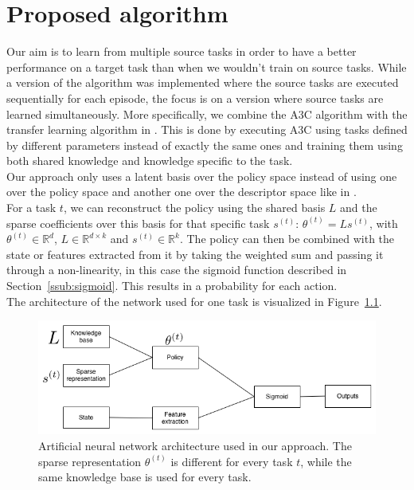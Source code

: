 \chapter{Proposed algorithm}
\label{cha:proposed_algorithm} %
Our aim is to learn from multiple source tasks in order to have a better performance on a target task than when we wouldn't train on source tasks.
While a version of the algorithm was implemented where the source tasks are executed sequentially for each episode, the focus is on a version where source tasks are learned simultaneously.
More specifically, we combine the A3C algorithm \parencite{Mnih2016AsynchronousLearning} with the transfer learning algorithm in \cite{Isele2016UsingLearning}.
This is done by executing A3C using tasks defined by different parameters instead of exactly the same ones and training them using both shared knowledge and knowledge specific to the task.\\

Our approach only uses a latent basis over the policy space instead of using one over the policy space and another one over the descriptor space like in \cite{Isele2016UsingLearning}.\\
For a task $t$, we can reconstruct the policy using the shared basis $L$ and the sparse coefficients over this basis for that specific task $s^{(t)}$: $\theta^{(t)} = Ls^{(t)}$, with $\theta^{(t)} \in \mathbb{R}^d$, $L \in \mathbb{R}^{d \times k}$ and $s^{(t)} \in \mathbb{R}^k$. The policy can then be combined with the state or features extracted from it by taking the weighted sum and passing it through a non-linearity, in this case the sigmoid function described in Section~\ref{ssub:sigmoid}.
This results in a probability for each action.\\
The architecture of the network used for one task is visualized in Figure~\ref{fig:algonn}.
\begin{figure}[htb]
    \centering
    \includegraphics[width=.9\linewidth]{images/knowledge_transfer.png}
    \caption[Artificial neural network architecture used in our approach]{Artificial neural network architecture used in our approach. The sparse representation $\theta^{(t)}$ is different for every task $t$, while the same knowledge base is used for every task.}
    \label{fig:algonn}
\end{figure}\\

